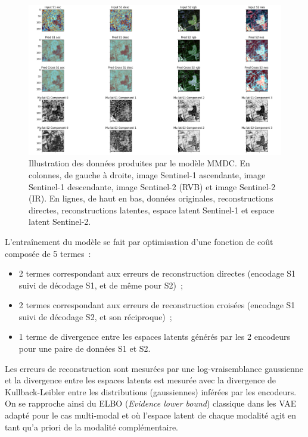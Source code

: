 \begin{figure}[htbp]
\begin{center}
\includegraphics[width=\columnwidth]{img/wp1/mmdc5.png}
\caption{Illustration des données produites par le modèle MMDC. En colonnes, de gauche à droite, image Sentinel-1 ascendante, image Sentinel-1 descendante, image Sentinel-2 (RVB) et image Sentinel-2 (IR). En lignes, de haut en bas, données originales, reconstructions directes, reconstructions latentes, espace latent Sentinel-1 et espace latent Sentinel-2.}
\label{fig:mmdcresults}
\end{center}
\end{figure}
L’entraînement du modèle se fait par optimisation d’une fonction de coût composée de 5 termes :
\begin{itemize}
\item 2 termes correspondant aux erreurs de reconstruction directes (encodage S1 suivi de décodage S1, et de même pour S2) ;
\item 2 termes correspondant aux erreurs de reconstruction croisées (encodage S1 suivi de décodage S2, et son réciproque) ;
\item 1 terme de divergence entre les espaces latents générés par les 2 encodeurs pour une paire de données S1 et S2.\\
\end{itemize}

Les erreurs de reconstruction sont mesurées par une log-vraisemblance gaussienne et la divergence entre les espaces latents est mesurée avec la divergence de Kullback-Leibler entre les distributions (gaussiennes) inférées par les encodeurs. On se rapproche ainsi du ELBO (\emph{Evidence lower bound}) classique dans les VAE adapté pour le cas multi-modal et où l’espace latent de chaque modalité agit en tant qu'a priori de la modalité complémentaire.

